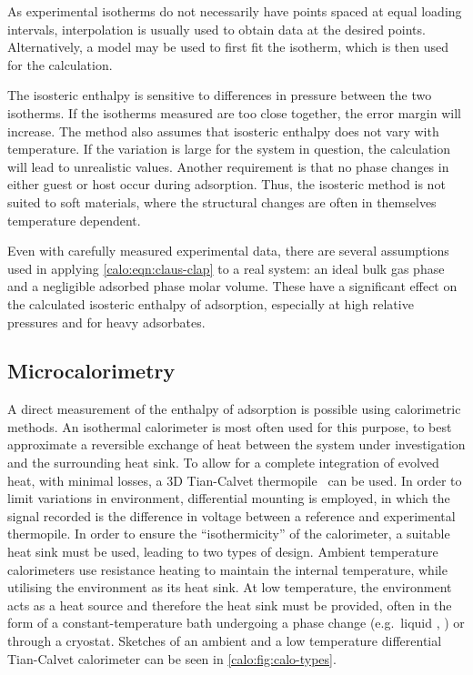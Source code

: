 As experimental isotherms do not necessarily have points spaced
at equal loading intervals, interpolation is usually used to obtain
data at the desired points. Alternatively, a model may be used
to first fit the isotherm, which is then used for the calculation.

The isosteric enthalpy is sensitive to differences in pressure between
the two isotherms. If the isotherms measured are too close together,
the error margin will increase. The method also assumes that isosteric
enthalpy does not vary with temperature. If the
variation is large for the system in question, the calculation will
lead to unrealistic values. Another requirement is that no phase 
changes in either guest or host occur during adsorption. Thus,
the isosteric method is not suited to soft materials, where the
structural changes are often in themselves temperature dependent.

Even with carefully measured experimental data, there are several
assumptions used in applying \autoref{calo:eqn:claus-clap} to
a real system: 
an ideal bulk gas phase and a negligible adsorbed phase
molar volume. These have a significant effect on the calculated
isosteric enthalpy of adsorption, especially at high relative pressures
and for heavy adsorbates.

\subsection{Microcalorimetry}\label{calo:method:calo}

A direct measurement of the enthalpy of adsorption is possible using
calorimetric methods.
An isothermal calorimeter is most often used for this purpose,
to best approximate a reversible exchange of heat between the
system under investigation and the surrounding
heat sink. To allow for a complete integration of evolved heat,
with minimal losses, a 3D Tian-Calvet thermopile~\cite{calvetRecentProgressMicrocalorimetry1963}
can be used. In order to limit variations in environment,
differential mounting is employed, in which the signal recorded
is the difference in voltage between a reference and experimental
thermopile. In order to ensure the ``isothermicity'' of the calorimeter, a
suitable heat sink must be used, leading to two types of design.
Ambient temperature calorimeters use resistance heating to
maintain the internal temperature, while utilising the environment
as its heat sink. At low temperature, the
environment acts as a heat source and therefore the heat sink must
be provided, often in the form of a constant-temperature bath
undergoing a phase change (e.g.\ liquid , ) 
or through a cryostat. Sketches of
an ambient and a low temperature differential Tian-Calvet calorimeter
can be seen in \autoref{calo:fig:calo-types}.

